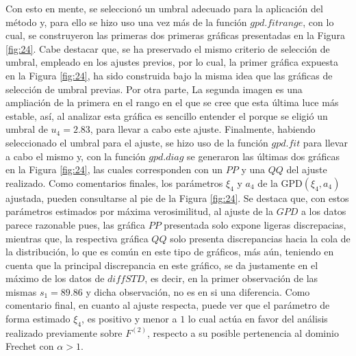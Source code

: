 \documentclass[10.5pt,notitlepage]{article}
\theoremstyle{plain}
\begin{document}
Con esto en mente, se seleccionó un umbral adecuado para la aplicación del método y, para ello se hizo uso una vez más de la función \(gpd.fitrange\), con lo cual, se construyeron las primeras dos primeras gráficas presentadas en la Figura \ref{fig:24}. Cabe destacar que, se ha preservado el mismo criterio de selección de umbral, empleado en los ajustes previos, por lo cual, la primer gráfica expuesta en la Figura \ref{fig:24}, ha sido construida bajo la misma idea que las gráficas de selección de umbral previas. Por otra parte, La segunda imagen es una ampliación de la primera en el rango en el que se cree que esta última luce más estable, así, al analizar esta gráfica es sencillo entender el porque se eligió un umbral de \(u_4 = 2.83\), para llevar a cabo este ajuste. Finalmente, habiendo seleccionado el umbral para el ajuste, se hizo uso de la función \(gpd.fit\) para llevar a cabo el mismo y, con la función \(gpd.diag\) se generaron las últimas dos gráficas en la Figura \ref{fig:24}, las cuales corresponden con un \(PP\) y una \(QQ\) del ajuste realizado. Como comentarios finales, los parámetros \(\xi_4\) y \(a_4\) de la GPD\((\xi_4,a_4)\) ajustada, pueden consultarse al pie de la Figura \ref{fig:24}. Se destaca que, con estos parámetros estimados por máxima verosimilitud, al ajuste de la \(GPD\) a los datos parece razonable pues, las gráfica \(PP\) presentada solo expone ligeras discrepacias, mientras que, la respectiva gráfica \(QQ\) solo presenta discrepancias hacia la cola de la distribución, lo que es común en este tipo de gráficos, más aún, teniendo en cuenta que la principal discrepancia en este gráfico, se da justamente en el máximo de los datos de \(diffSTD\), es decir, en la primer observación de las mismas \(s_1 = 89.86\) y dicha observación, no es en si una diferencia. Como comentario final, en cuanto al ajuste respecta, puede ver que el parámetro de forma estimado \(\xi_4\), es positivo y menor a \(1\) lo cual actúa en favor del análisis realizado previamente sobre \(F^{(2)}\), respecto a su posible pertenencia al dominio Frechet con \(\alpha > 1\).
\end{document}
